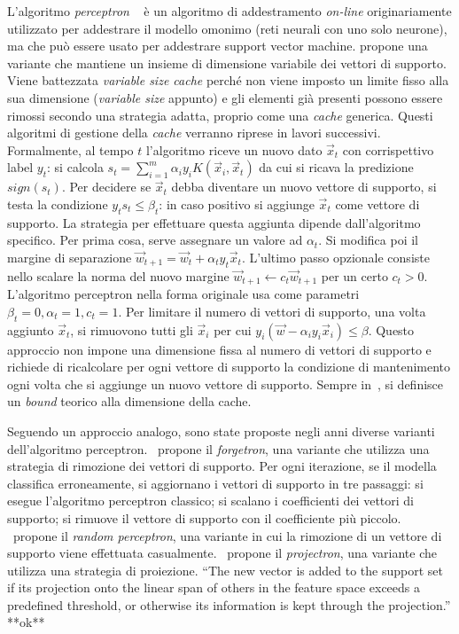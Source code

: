 L'algoritmo \emph{perceptron} ~\cite{1958_perceptron} è un algoritmo di addestramento \emph{on-line} originariamente utilizzato per addestrare il modello omonimo (reti neurali con uno solo neurone), ma che può essere usato per addestrare support vector machine. \cite{2003_online_classification_on_a_budget} propone una variante che mantiene un insieme di dimensione variabile dei vettori di supporto. Viene battezzata \emph{variable size cache} perché non viene imposto un limite fisso alla sua dimensione (\emph{variable size} appunto) e gli elementi già presenti possono essere rimossi secondo una strategia adatta, proprio come una \emph{cache} generica. Questi algoritmi di gestione della \emph{cache} verranno riprese in lavori successivi.
Formalmente, al tempo $t$ l'algoritmo riceve un nuovo dato $\Vec{x}_t$ con corrispettivo label $y_t$: si calcola $s_t = \sum_{i=1}^{m} \alpha_iy_iK(\Vec{x}_i, \Vec{x}_t)$ da cui si ricava la predizione $sign(s_t)$. 
Per decidere se $\Vec{x}_t$ debba diventare un nuovo vettore di supporto, si testa la condizione $y_ts_t \leq \beta_t$: in caso positivo si aggiunge $\Vec{x}_t$ come vettore di supporto. La strategia per effettuare questa aggiunta dipende dall'algoritmo specifico. Per prima cosa, serve assegnare un valore ad $\alpha_t$. Si modifica poi il margine di separazione $\Vec{w}_{t+1} = \Vec{w}_t + \alpha_ty_t\Vec{x}_t$. L'ultimo passo opzionale consiste nello scalare la norma del nuovo margine $\Vec{w}_{t+1} \leftarrow c_t\Vec{w}_{t+1}$ per un certo $c_t > 0$. L'algoritmo perceptron nella forma originale usa come parametri $\beta_t=0, \alpha_t=1, c_t=1$. Per limitare il numero di vettori di supporto, una volta aggiunto $\Vec{x}_t$, si rimuovono tutti gli $\Vec{x}_i$ per cui $y_i(\Vec{w} - \alpha_iy_i\Vec{x}_i)\leq \beta$. Questo approccio non impone una dimensione fissa al numero di vettori di supporto e richiede di ricalcolare per ogni vettore di supporto la condizione di mantenimento ogni volta che si aggiunge un nuovo vettore di supporto. 
Sempre in~\cite{2003_online_classification_on_a_budget}, si definisce un \emph{bound} teorico alla dimensione della cache.


Seguendo un approccio analogo, sono state proposte negli anni diverse varianti dell'algoritmo perceptron.
\cite{2005_forgetron}~propone il \emph{forgetron}, una variante che utilizza una strategia di rimozione dei vettori di supporto. Per ogni iterazione, se il modella classifica erroneamente, si aggiornano i vettori di supporto in tre passaggi: si esegue l'algoritmo perceptron classico; si scalano i coefficienti dei vettori di supporto; si rimuove il vettore di supporto con il coefficiente più piccolo.
%
\cite{2007_random_removal}~propone il \emph{random perceptron}, una variante in cui la rimozione di un vettore di supporto viene effettuata casualmente. 
%
\cite{2008_projectron}~propone il \emph{projectron}, una variante che utilizza una strategia di proiezione. 
``The new vector is added to the support set if its
projection onto the linear span of others in the feature space exceeds a predefined threshold,
or otherwise its information is kept through the projection.'' **ok**
%

